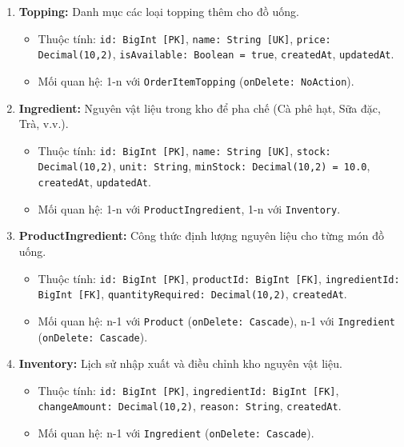 \documentclass[11pt,a4paper]{article}
\begin{document}
\begin{enumerate}[leftmargin=*,resume]
\begin{itemize}[leftmargin=*,noitemsep]
        \item Mối quan hệ: n-1 với \texttt{Product} (\texttt{onDelete: Cascade}), 1-n với \texttt{OrderItem}.
    \end{itemize}
    \item \textbf{Topping:} Danh mục các loại topping thêm cho đồ uống.
    \begin{itemize}[leftmargin=*,noitemsep]
        \item Thuộc tính: \texttt{id: BigInt [PK]}, \texttt{name: String [UK]}, \texttt{price: Decimal(10,2)}, \texttt{isAvailable: Boolean = true}, \texttt{createdAt}, \texttt{updatedAt}.
        \item Mối quan hệ: 1-n với \texttt{OrderItemTopping} (\texttt{onDelete: NoAction}).
    \end{itemize}
    \item \textbf{Ingredient:} Nguyên vật liệu trong kho để pha chế (Cà phê hạt, Sữa đặc, Trà, v.v.).
    \begin{itemize}[leftmargin=*,noitemsep]
        \item Thuộc tính: \texttt{id: BigInt [PK]}, \texttt{name: String [UK]}, \texttt{stock: Decimal(10,2)}, \texttt{unit: String}, \texttt{minStock: Decimal(10,2) = 10.0}, \texttt{createdAt}, \texttt{updatedAt}.
        \item Mối quan hệ: 1-n với \texttt{ProductIngredient}, 1-n với \texttt{Inventory}.
    \end{itemize}
    \item \textbf{ProductIngredient:} Công thức định lượng nguyên liệu cho từng món đồ uống.
    \begin{itemize}[leftmargin=*,noitemsep]
        \item Thuộc tính: \texttt{id: BigInt [PK]}, \texttt{productId: BigInt [FK]}, \texttt{ingredientId: BigInt [FK]}, \texttt{quantityRequired: Decimal(10,2)}, \texttt{createdAt}.
        \item Mối quan hệ: n-1 với \texttt{Product} (\texttt{onDelete: Cascade}), n-1 với \texttt{Ingredient} (\texttt{onDelete: Cascade}).
    \end{itemize}
    \item \textbf{Inventory:} Lịch sử nhập xuất và điều chỉnh kho nguyên vật liệu.
    \begin{itemize}[leftmargin=*,noitemsep]
        \item Thuộc tính: \texttt{id: BigInt [PK]}, \texttt{ingredientId: BigInt [FK]}, \texttt{changeAmount: Decimal(10,2)}, \texttt{reason: String}, \texttt{createdAt}.
        \item Mối quan hệ: n-1 với \texttt{Ingredient} (\texttt{onDelete: Cascade}).
    \end{itemize}
\end{enumerate}
\clearpage
\end{document}
